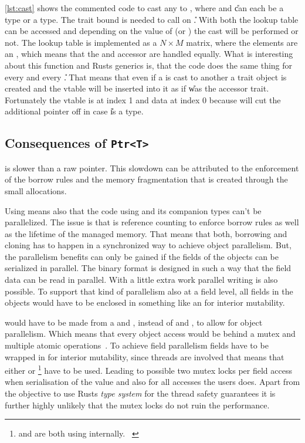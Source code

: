 \documentclass[thesis]{subfiles}
\begin{document}

    \autoref{lst:cast} shows the commented code to cast any \PtrT to , where \T and \U can each be a \struct type or a \trait type.
    The \CastAble trait bound is needed to call  on \U.
    With both \ids the lookup table can be accessed and depending on the value of \OptionT (\SomeT or \None) the cast will be performed or not.
    The lookup table is implemented as a $N \times M$ matrix, where the elements are an , which means that the \struct and accessor \trait are handled equally.
    What is interesting about this function and Rusts generics is, that the code does the same thing for every \T and every \U.
    That means that even if a \struct is cast to another \struct a trait object is created and the vtable will be inserted into it as if \U was the accessor trait.
    Fortunately the vtable is at index 1 and data at index 0 because  will cut the additional pointer off in case \U is a \struct type.

  \subsection{Consequences of \texttt{Ptr<T>}}\label{sec:badptr}
    \PtrT is slower than a raw pointer.
    This slowdown can be attributed to the enforcement of the borrow rules and the memory fragmentation that is created through the small allocations.

    Using \PtrT means also that the code using \PtrT and its companion types can't be parallelized.
    The issue is that \PtrT is reference counting to enforce borrow rules as well as the lifetime of the managed memory.
    That means that both, borrowing and cloning has to happen in a synchronized way to achieve object parallelism.
    But, the parallelism benefits can only be gained if the fields of the objects can be serialized in parallel.
    The binary format is designed in such a way that the field data can be read in parallel.
    With a little extra work parallel writing is also possible.
    To support that kind of parallelism also at a field level, all fields in the objects would have to be enclosed in something like an \UnsafeCellT for interior mutability.

    \PtrT would have to be made from a \ArcT and \RwLockT, instead of \RcT and \RefCellT, to allow for object parallelism.
    Which means that every object access would be behind a mutex and multiple atomic operations~\autocite[std::sync::Arc, std::sync::RwLock]{rust-doc}.
    To achieve field parallelism fields have to be wrapped in \UnsafeCellT for interior mutability, since threads are involved that means that either \MutexT or \RwLockT\footnote{
      \MutexT and \RwLockT are both using \UnsafeCellT internally.%
      ~\autocite[std::sync::Mutex, std::sync::RwLock]{rust-doc}
    } have to be used.
    Leading to possible two mutex locks per field access when serialisation of the value and also for all accesses the users does.
    Apart from the objective to use Rusts \emph{type system} for the thread safety guarantees it is further highly unlikely that the mutex locks do not ruin the performance.
\end{document}
